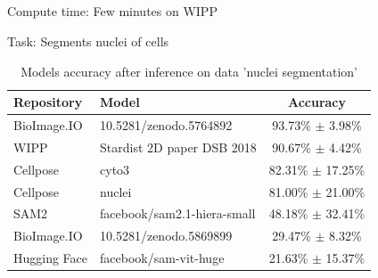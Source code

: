 \subsection{\slidetitle}
\begin{frame}
  \frametitle{\sectiontitle}
  \framesubtitle{\slidetitle}

  Compute time: Few minutes on WIPP

  Task: Segments nuclei of cells

  \begin{center}
    \begin{table}
        \begin{tabular}{|l|l|c|}
            \hline
            \rowcolor{tableFirstRowColor}  Repository   & Model                         & Accuracy \\ [0.5ex]
            \hline
            \cellcolor{tableFirstColColor} BioImage.IO  & 10.5281/zenodo.5764892        & 93.73\% $\pm$ 3.98\% \\
            \hline
            \cellcolor{tableFirstColColor} WIPP         & Stardist 2D paper DSB 2018    & 90.67\% $\pm$ 4.42\% \\
            \hline
            \cellcolor{tableFirstColColor} Cellpose     & cyto3                         & 82.31\% $\pm$ 17.25\% \\
            \hline
            \cellcolor{tableFirstColColor} Cellpose     & nuclei                        & 81.00\% $\pm$ 21.00\% \\
            \hline
            \hline
            \cellcolor{tableFirstColColor} SAM2         & facebook/sam2.1-hiera-small   & 48.18\% $\pm$ 32.41\% \\
            \hline
            \cellcolor{tableFirstColColor} BioImage.IO  & 10.5281/zenodo.5869899        & 29.47\% $\pm$ 8.32\% \\
            \hline
            \cellcolor{tableFirstColColor} Hugging Face & facebook/sam-vit-huge         & 21.63\% $\pm$ 15.37\% \\
            \hline
        \end{tabular}
      \caption{Models accuracy after inference on data 'nuclei segmentation'}
    \end{table}
  \end{center}

\end{frame}

